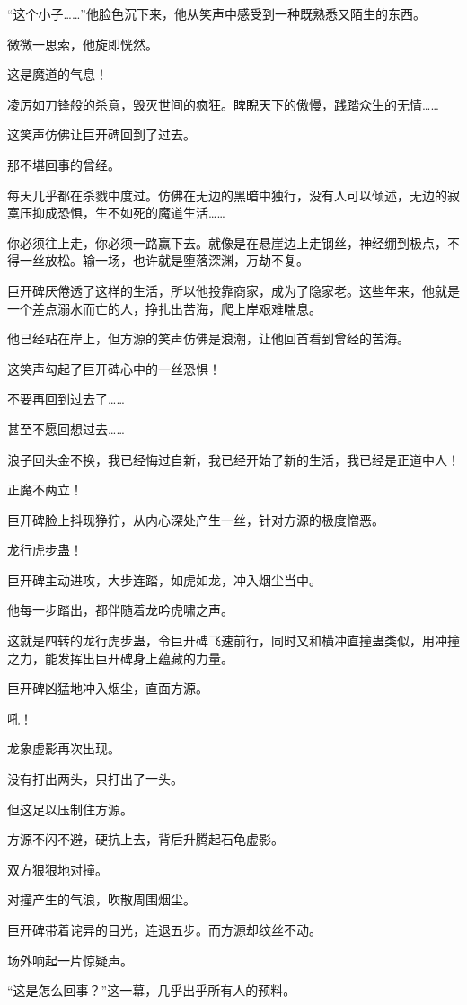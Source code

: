 \begin{this_body}
“这个小子……”他脸色沉下来，他从笑声中感受到一种既熟悉又陌生的东西。

微微一思索，他旋即恍然。

这是魔道的气息！

凌厉如刀锋般的杀意，毁灭世间的疯狂。睥睨天下的傲慢，践踏众生的无情……

这笑声仿佛让巨开碑回到了过去。

那不堪回事的曾经。

每天几乎都在杀戮中度过。仿佛在无边的黑暗中独行，没有人可以倾述，无边的寂寞压抑成恐惧，生不如死的魔道生活……

你必须往上走，你必须一路赢下去。就像是在悬崖边上走钢丝，神经绷到极点，不得一丝放松。输一场，也许就是堕落深渊，万劫不复。

巨开碑厌倦透了这样的生活，所以他投靠商家，成为了隐家老。这些年来，他就是一个差点溺水而亡的人，挣扎出苦海，爬上岸艰难喘息。

他已经站在岸上，但方源的笑声仿佛是浪潮，让他回首看到曾经的苦海。

这笑声勾起了巨开碑心中的一丝恐惧！

不要再回到过去了……

甚至不愿回想过去……

浪子回头金不换，我已经悔过自新，我已经开始了新的生活，我已经是正道中人！

正魔不两立！

巨开碑脸上抖现狰狞，从内心深处产生一丝，针对方源的极度憎恶。

龙行虎步蛊！

巨开碑主动进攻，大步连踏，如虎如龙，冲入烟尘当中。

他每一步踏出，都伴随着龙吟虎啸之声。

这就是四转的龙行虎步蛊，令巨开碑飞速前行，同时又和横冲直撞蛊类似，用冲撞之力，能发挥出巨开碑身上蕴藏的力量。

巨开碑凶猛地冲入烟尘，直面方源。

吼！

龙象虚影再次出现。

没有打出两头，只打出了一头。

但这足以压制住方源。

方源不闪不避，硬抗上去，背后升腾起石龟虚影。

双方狠狠地对撞。

对撞产生的气浪，吹散周围烟尘。

巨开碑带着诧异的目光，连退五步。而方源却纹丝不动。

场外响起一片惊疑声。

“这是怎么回事？”这一幕，几乎出乎所有人的预料。


\end{this_body}
